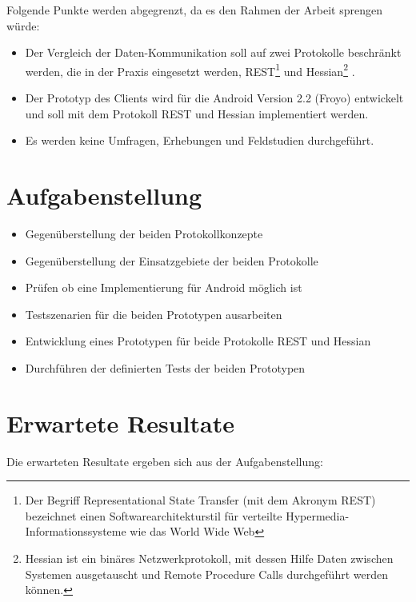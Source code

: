 \documentclass[listof=totoc,bibliography=totoc]{scrreprt}
\begin{document}
    Folgende Punkte werden abgegrenzt, da es den Rahmen der Arbeit sprengen 
    würde:
    
    \begin{itemize}
        \item Der Vergleich der Daten-Kommunikation soll auf zwei Protokolle
            beschränkt werden, die in der Praxis eingesetzt werden,
            REST\footnote{
                Der Begriff Representational State Transfer (mit dem Akronym
                REST) bezeichnet einen Softwarearchitekturstil für verteilte
                Hypermedia-Informationssysteme wie das World Wide Web}
            und Hessian\footnote{
                Hessian ist ein binäres Netzwerkprotokoll, mit dessen Hilfe
                Daten zwischen Systemen ausgetauscht und Remote Procedure Calls
                durchgeführt werden können.}
            .
        \item Der Prototyp des Clients wird für die Android Version 2.2 (Froyo)
            entwickelt und soll mit dem Protokoll REST und Hessian
            implementiert werden.
        \item Es werden keine Umfragen, Erhebungen und Feldstudien
            durchgeführt.
    \end{itemize}

    \newpage
    
    \section{Aufgabenstellung}
    
    \begin{itemize}
        \item Gegenüberstellung der beiden Protokollkonzepte
        \item Gegenüberstellung der Einsatzgebiete der beiden Protokolle
        \item Prüfen ob eine Implementierung für Android möglich ist
        \item Testszenarien für die beiden Prototypen ausarbeiten
        \item Entwicklung eines Prototypen für beide Protokolle REST und
            Hessian
        \item Durchführen der definierten Tests der beiden Prototypen
    \end{itemize}

    \section{Erwartete Resultate}
    Die erwarteten Resultate ergeben sich aus der Aufgabenstellung:
\end{document}

